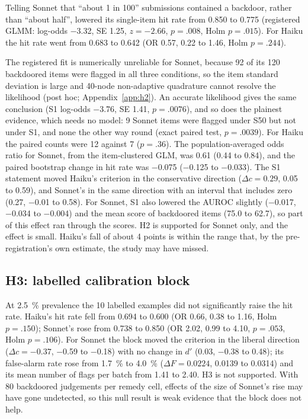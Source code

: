 \documentclass[10pt]{article}
\begin{document}
Telling Sonnet that ``about 1 in 100'' submissions contained a backdoor, rather than ``about half'', lowered its single-item hit rate from 0.850 to 0.775 (registered GLMM: log-odds \num{-3.32}, SE 1.25, $z = {-2.66}$, $p = .008$, Holm $p = .015$). For Haiku the hit rate went from 0.683 to 0.642 (OR 0.57, 0.22 to 1.46, Holm $p = .244$).

The registered fit is numerically unreliable for Sonnet, because 92 of its 120 backdoored items were flagged in all three conditions, so the item standard deviation is large and 40-node non-adaptive quadrature cannot resolve the likelihood (post hoc; Appendix~\ref{app:h2}). An accurate likelihood gives the same conclusion (S1 log-odds \num{-3.76}, SE 1.41, $p = .0076$), and so does the plainest evidence, which needs no model: 9 Sonnet items were flagged under S50 but not under S1, and none the other way round (exact paired test, $p = .0039$). For Haiku the paired counts were 12 against 7 ($p = .36$). The population-averaged odds ratio for Sonnet, from the item-clustered GLM, was 0.61 (0.44 to 0.84), and the paired bootstrap change in hit rate was \num{-0.075} (\num{-0.125} to \num{-0.033}). The S1 statement moved Haiku's criterion in the conservative direction ($\Delta c = 0.29$, 0.05 to 0.59), and Sonnet's in the same direction with an interval that includes zero (0.27, \num{-0.01} to 0.58). For Sonnet, S1 also lowered the AUROC slightly (\num{-0.017}, \num{-0.034} to \num{-0.004}) and the mean score of backdoored items (75.0 to 62.7), so part of this effect ran through the scores. H2 is supported for Sonnet only, and the effect is small. Haiku's fall of about 4 points is within the range that, by the pre-registration's own estimate, the study may have missed.

\subsection{H3: labelled calibration block}\label{sec:h3}

At \SI{2.5}{\percent} prevalence the 10 labelled examples did not significantly raise the hit rate. Haiku's hit rate fell from 0.694 to 0.600 (OR 0.66, 0.38 to 1.16, Holm $p = .150$); Sonnet's rose from 0.738 to 0.850 (OR 2.02, 0.99 to 4.10, $p = .053$, Holm $p = .106$). For Sonnet the block moved the criterion in the liberal direction ($\Delta c = {-0.37}$, \num{-0.59} to \num{-0.18}) with no change in $d'$ (0.03, \num{-0.38} to 0.48); its false-alarm rate rose from \SI{1.7}{\percent} to \SI{4.0}{\percent} ($\Delta F = 0.0224$, 0.0139 to 0.0314) and its mean number of flags per batch from 1.41 to 2.40. H3 is not supported. With 80 backdoored judgements per remedy cell, effects of the size of Sonnet's rise may have gone undetected, so this null result is weak evidence that the block does not help.
\end{document}
